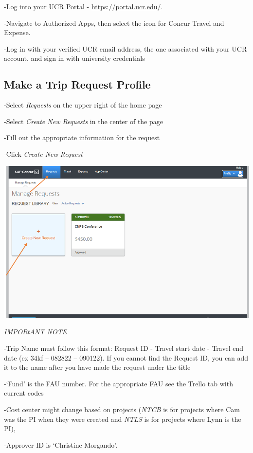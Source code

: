 \documentclass[
]{book}
\begin{document}
-Log into your UCR Portal - \url{https://portal.ucr.edu/}.

-Navigate to Authorized Apps, then select the icon for Concur Travel and Expense.

-Log in with your verified UCR email address, the one associated with your UCR account, and sign in with university credentials

\hypertarget{make-a-trip-request-profile}{%
\subsection{Make a Trip Request Profile}\label{make-a-trip-request-profile}}

-Select \emph{Requests} on the upper right of the home page

-Select \emph{Create New Requests} in the center of the page

-Fill out the appropriate information for the request

-Click \emph{Create New Request}

\begin{flushleft}\includegraphics[width=0.75\linewidth]{images/concur1} \end{flushleft}

\emph{IMPORtANT NOTE}

-Trip Name must follow this format: Request ID - Travel start date - Travel end date (ex 34kf -- 082822 -- 090122). If you cannot find the Request ID, you can add it to the name after you have made the request under the title

-`Fund' is the FAU number. For the appropriate FAU see the Trello tab with current codes

-Cost center might change based on projects (\emph{NTCB} is for projects where Cam was the PI when they were created and \emph{NTLS} is for projects where Lynn is the PI),

-Approver ID is `Christine Morgando'.
\end{document}

